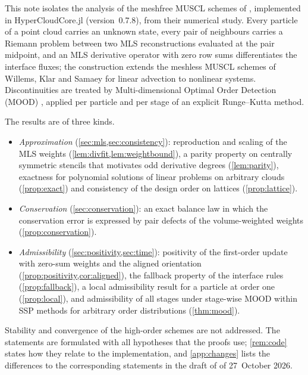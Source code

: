 \documentclass[11pt,a4paper]{article}
\theoremstyle{plain}
\theoremstyle{definition}
\theoremstyle{remark}
\numberwithin{equation}{section}
\begin{document}
This note isolates the analysis of the meshfree MUSCL schemes of \cite{JungMUSCL2026}, implemented in HyperCloudCore.jl \cite{jung_hypercloudcore} (version~0.7.8), from their numerical study. Every particle of a point cloud carries an unknown state, every pair of neighbours carries a Riemann problem between two MLS reconstructions evaluated at the pair midpoint, and an MLS derivative operator with zero row sums differentiates the interface fluxes; the construction extends the meshless MUSCL schemes of Willems, Klar and Samaey \cite{Willems2025} for linear advection to nonlinear systems. Discontinuities are treated by Multi-dimensional Optimal Order Detection (MOOD) \cite{Clain2011,Diot2012,Diot2013}, applied per particle and per stage of an explicit Runge--Kutta method.

The results are of three kinds.
\begin{itemize}
\item \emph{Approximation} (\cref{sec:mls,sec:consistency}): reproduction and scaling of the MLS weights (\cref{lem:divfit,lem:weightbound}), a parity property on centrally symmetric stencils that motivates odd derivative degrees (\cref{lem:parity}), exactness for polynomial solutions of linear problems on arbitrary clouds (\cref{prop:exact}) and consistency of the design order on lattices (\cref{prop:lattice}).
\item \emph{Conservation} (\cref{sec:conservation}): an exact balance law in which the conservation error is expressed by pair defects of the volume-weighted weights (\cref{prop:conservation}).
\item \emph{Admissibility} (\cref{sec:positivity,sec:time}): positivity of the first-order update with zero-sum weights and the aligned orientation (\cref{prop:positivity,cor:aligned}), the fallback property of the interface rules (\cref{prop:fallback}), a local admissibility result for a particle at order one (\cref{prop:local}), and admissibility of all stages under stage-wise MOOD within SSP methods for arbitrary order distributions (\cref{thm:mood}).
\end{itemize}
Stability and convergence of the high-order schemes are not addressed. The statements are formulated with all hypotheses that the proofs use; \cref{rem:code} states how they relate to the implementation, and \cref{app:changes} lists the differences to the corresponding statements in the draft of \cite{JungMUSCL2026} of 27~October 2026.
\end{document}
